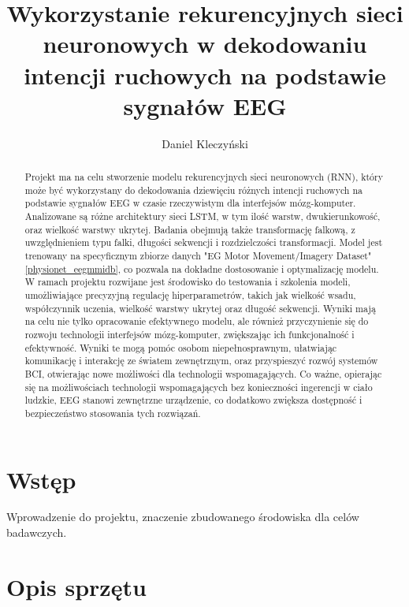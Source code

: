 \documentclass[12pt,twoside]{article}
\author{Daniel Kleczyński}
\title{Wykorzystanie rekurencyjnych sieci neuronowych w
dekodowaniu intencji ruchowych na podstawie sygnałów EEG}
\begin{document}
\maketitle

\blankpage

\tableofcontents

\clearpage
\blankpage


\begin{abstract}

Projekt ma na celu stworzenie modelu rekurencyjnych sieci neuronowych (RNN), który może być wykorzystany do dekodowania dziewięciu różnych intencji ruchowych na podstawie sygnałów EEG w czasie rzeczywistym dla interfejsów mózg-komputer. Analizowane są różne architektury sieci LSTM, w tym ilość warstw, dwukierunkowość, oraz wielkość warstwy ukrytej. Badania obejmują także transformację falkową, z uwzględnieniem typu falki, długości sekwencji i rozdzielczości transformacji. Model jest trenowany na specyficznym zbiorze danych "EG Motor Movement/Imagery Dataset" \ref{physionet_eegmmidb}, co pozwala na dokładne dostosowanie i optymalizację modelu. W ramach projektu rozwijane jest środowisko do testowania i szkolenia modeli, umożliwiające precyzyjną regulację hiperparametrów, takich jak wielkość wsadu, współczynnik uczenia, wielkość warstwy ukrytej oraz długość sekwencji. Wyniki mają na celu nie tylko opracowanie efektywnego modelu,  ale również przyczynienie się do rozwoju technologii interfejsów mózg-komputer, zwiększając ich funkcjonalność i efektywność. Wyniki te mogą pomóc osobom niepełnosprawnym, ułatwiając komunikację i interakcję ze światem zewnętrznym, oraz przyspieszyć rozwój systemów BCI, otwierając nowe możliwości dla technologii wspomagających. Co ważne, opierając się na możliwościach technologii wspomagających bez konieczności ingerencji w ciało ludzkie, EEG stanowi zewnętrzne urządzenie, co dodatkowo zwiększa dostępność i bezpieczeństwo stosowania tych rozwiązań.
\end{abstract}

\clearpage
\section{Wstęp}
Wprowadzenie do projektu, znaczenie zbudowanego środowiska dla celów badawczych.

\section{Opis sprzętu}
\end{document}
